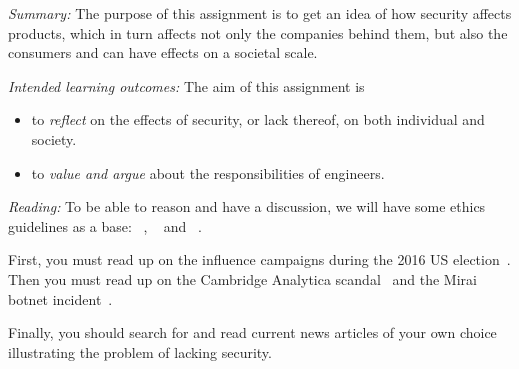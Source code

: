 

\emph{Summary:}
The purpose of this assignment is to get an idea of how security affects 
products, which in turn affects not only the companies behind them, but also 
the consumers and can have effects on a societal scale.

\emph{Intended learning outcomes:}
The aim of this assignment is
\begin{itemize}
\item to \emph{reflect} on the effects of security, or lack thereof, on both 
  individual and society.
\item to \emph{value and argue} about the responsibilities of engineers.
\end{itemize}


\emph{Reading:}
%
To be able to reason and have a discussion, we will have some ethics guidelines 
as a base:
~\cite{acmcode},
~\cite{acmsecode} and
~\cite{ieeecode}.

First, you must read up on the influence campaigns during the 2016 US 
election~\cite{inside-russian-influence-campaign}.
Then you must read up on the Cambridge Analytica scandal~\cite[\eg][]{%
  wired-cambridge-analytica,
  guardian-cambridge-analytica,
  nytimes-cambridge-analytica,
  wp-cambridge-analytica,
} and the Mirai botnet incident~\cite{schneier-mirai}.

Finally, you should search for and read current news articles of your own 
choice illustrating the problem of lacking security.
